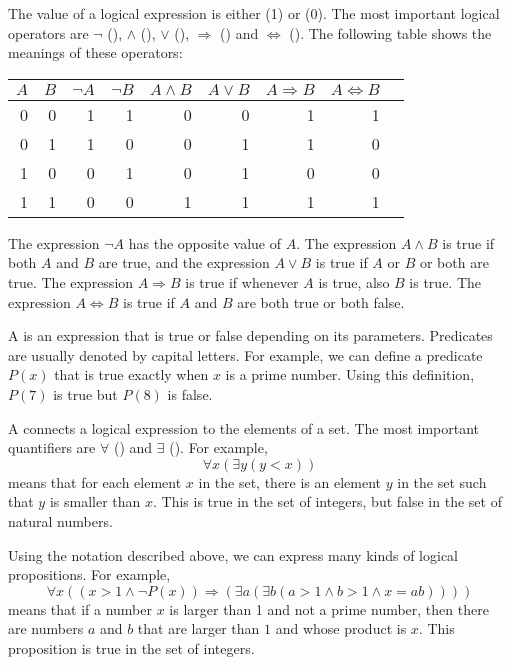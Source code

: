 
The value of a logical expression is either
 (1) or  (0).
The most important logical operators are
$\lnot$ (),
$\land$ (),
$\lor$ (),
$\Rightarrow$ () and
$\Leftrightarrow$ ().
The following table shows the meanings of these operators:

\begin{center}
\begin{tabular}{rr|rrrrrrr}
$A$ & $B$ & $\lnot A$ & $\lnot B$ & $A \land B$ & $A \lor B$ & $A \Rightarrow B$ & $A \Leftrightarrow B$ \\
\hline
0 & 0 & 1 & 1 & 0 & 0 & 1 & 1 \\
0 & 1 & 1 & 0 & 0 & 1 & 1 & 0 \\
1 & 0 & 0 & 1 & 0 & 1 & 0 & 0 \\
1 & 1 & 0 & 0 & 1 & 1 & 1 & 1 \\
\end{tabular}
\end{center}

The expression $\lnot A$ has the opposite value of $A$.
The expression $A \land B$ is true if both $A$ and $B$
are true,
and the expression $A \lor B$ is true if $A$ or $B$ or both
are true.
The expression $A \Rightarrow B$ is true
if whenever $A$ is true, also $B$ is true.
The expression $A \Leftrightarrow B$ is true
if $A$ and $B$ are both true or both false.


A  is an expression that is true or false
depending on its parameters.
Predicates are usually denoted by capital letters.
For example, we can define a predicate $P(x)$
that is true exactly when $x$ is a prime number.
Using this definition, $P(7)$ is true but $P(8)$ is false.


A  connects a logical expression
to the elements of a set.
The most important quantifiers are
$\forall$ () and $\exists$ ().
For example,
\[\forall x (\exists y (y < x))\]
means that for each element $x$ in the set,
there is an element $y$ in the set
such that $y$ is smaller than $x$.
This is true in the set of integers,
but false in the set of natural numbers.

Using the notation described above,
we can express many kinds of logical propositions.
For example,
\[\forall x ((x>1 \land \lnot P(x)) \Rightarrow (\exists a (\exists b (a > 1 \land b > 1 \land x = ab))))\]
means that if a number $x$ is larger than 1
and not a prime number,
then there are numbers $a$ and $b$
that are larger than $1$ and whose product is $x$.
This proposition is true in the set of integers.

